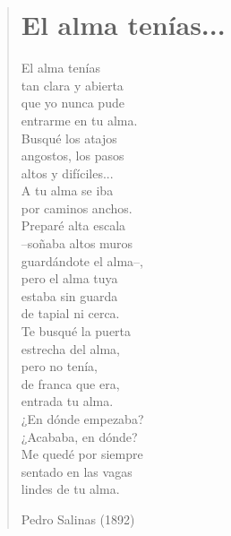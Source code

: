 \documentclass[12pt, twoside]{book}
\begin{document}
\begin{verse}
\begin{center}
\section{El alma tenías...}
\end{center}
El alma tenías\\
tan clara y abierta\\
que yo nunca pude\\
entrarme en tu alma.\\
Busqué los atajos\\
angostos, los pasos\\
altos y difíciles...\\
A tu alma se iba\\
por caminos anchos.\\
Preparé alta escala\\
--soñaba altos muros\\
guardándote el alma--,\\
pero el alma tuya\\
estaba sin guarda\\
de tapial ni cerca.\\
Te busqué la puerta\\
estrecha del alma,\\
pero no tenía,\\
de franca que era,\\
entrada tu alma.\\
¿En dónde empezaba?\\
¿Acababa, en dónde?\\
Me quedé por siempre\\
sentado en las vagas\\
lindes de tu alma.\newline

Pedro Salinas (1892)

\end{verse}
\newpage
\end{document}
